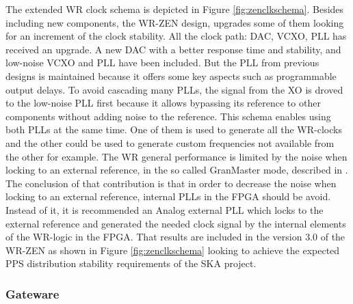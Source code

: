 The extended WR clock schema is depicted in Figure \ref{fig:zenclkschema}. 
Besides including new components, the WR-ZEN design, upgrades some of them 
looking for an increment of the clock stability. All the clock path: DAC, VCXO, 
PLL has received an upgrade. A new DAC with a better response time and 
stability, and low-noise VCXO and PLL have been included. But the PLL from 
previous designs is maintained because it offers some key aspects such as 
programmable output delays. To avoid cascading many PLLs, the signal from the 
XO is droved to the low-noise PLL first because it allows bypassing its 
reference to other components without adding noise to the reference. This 
schema enables using both PLLs at the same time. One of them is used to 
generate all the WR-clocks and the other could be used to generate custom 
frequencies not available from the other for example. The WR general 
performance is limited by the noise when locking to an external reference, in 
the so called GranMaster mode, described in \cite{Rizzi2016}. The conclusion of 
that contribution is that in order to decrease the noise when locking to an 
external reference, internal PLLs in the FPGA should be avoid. Instead of it, 
it is recommended an Analog external PLL which locks to the external reference 
and generated the needed clock signal by the internal elements of the WR-logic 
in the FPGA. That results are included in the version 3.0 of the WR-ZEN as 
shown in Figure \ref{fig:zenclkschema} looking to achieve the expected PPS 
distribution stability requirements of the SKA project.


\subsubsection{Gateware}
\label{subsec:gateware}

